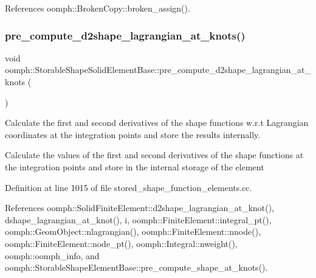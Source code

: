 References oomph\+::\+Broken\+Copy\+::broken\+\_\+assign().

\mbox{\label{classoomph_1_1StorableShapeSolidElementBase_a3f1b400868aa398cedc57e01d1eb1a24}} 
\subsubsection{\texorpdfstring{pre\+\_\+compute\+\_\+d2shape\+\_\+lagrangian\+\_\+at\+\_\+knots()}{pre\_compute\_d2shape\_lagrangian\_at\_knots()}}
{\footnotesize\ttfamily void oomph\+::\+Storable\+Shape\+Solid\+Element\+Base\+::pre\+\_\+compute\+\_\+d2shape\+\_\+lagrangian\+\_\+at\+\_\+knots (\begin{DoxyParamCaption}{ }\end{DoxyParamCaption})}



Calculate the first and second derivatives of the shape functions w.\+r.\+t Lagrangian coordinates at the integration points and store the results internally. 

Calculate the values of the first and second derivatives of the shape functions at the integration points and store in the internal storage of the element 

Definition at line 1015 of file stored\+\_\+shape\+\_\+function\+\_\+elements.\+cc.



References oomph\+::\+Solid\+Finite\+Element\+::d2shape\+\_\+lagrangian\+\_\+at\+\_\+knot(), dshape\+\_\+lagrangian\+\_\+at\+\_\+knot(), i, oomph\+::\+Finite\+Element\+::integral\+\_\+pt(), oomph\+::\+Geom\+Object\+::nlagrangian(), oomph\+::\+Finite\+Element\+::nnode(), oomph\+::\+Finite\+Element\+::node\+\_\+pt(), oomph\+::\+Integral\+::nweight(), oomph\+::oomph\+\_\+info, and oomph\+::\+Storable\+Shape\+Element\+Base\+::pre\+\_\+compute\+\_\+shape\+\_\+at\+\_\+knots().

\mbox{\label{classoomph_1_1StorableShapeSolidElementBase_a501f9f5b1d42e75de4bf6efaa86cf14a}} 
